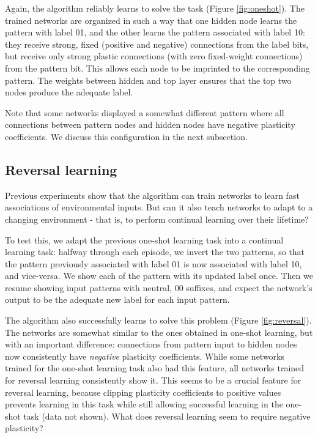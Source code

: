 \documentclass{article}
\begin{document}
Again, the algorithm reliably learns to solve the task (Figure
\ref{fig:oneshot}). The trained networks are
organized in such a way that one hidden node learns the pattern with label 01,
and the other learns the pattern associated with label 10: they receive strong,
fixed (positive and negative) connections from the label bits, but receive only
strong plastic connections (with zero fixed-weight connections) from the pattern
bit. This allows each node to be imprinted to the corresponding pattern. The weights between hidden and top layer ensures that the top two nodes
produce the adequate label.

Note that some networks displayed a somewhat different pattern where all
connections between pattern nodes and hidden nodes have negative plasticity
coefficients. We discuss this configuration in the next subsection.

\subsection{Reversal learning}

Previous experiments show that the algorithm can train networks to learn fast
associations of environmental inputs. But can it also teach networks to adapt to
a changing environment - that is, to perform continual learning over their
lifetime? 

To test this, we adapt the previous one-shot learning task into a
continual learning task: halfway through each episode, we invert the two
patterns, so that the pattern previously associated with label 01 is now
associated with label 10, and vice-versa. We show each of the pattern with its
updated label once. Then we resume showing input patterns with neutral, 00
suffixes, and expect the network's output to be the adequate new label for
each input pattern.


The algorithm also successfully learns to solve this problem (Figure
\ref{fig:reversal}). The networks are somewhat similar to the ones obtained in
one-shot
learning, but with an important difference: connections from pattern input
to hidden nodes now consistently have \emph{negative} plasticity coefficients. While some
networks trained for the one-shot learning task also had this feature,
all networks trained  for reversal learning consistently show it. This seems to
be a crucial feature for reversal learning, because clipping plasticity coefficients to positive values
prevents learning in this task while still allowing successful learning in the
one-shot task (data not shown). What does reversal learning seem to require
negative plasticity? 
\end{document}
